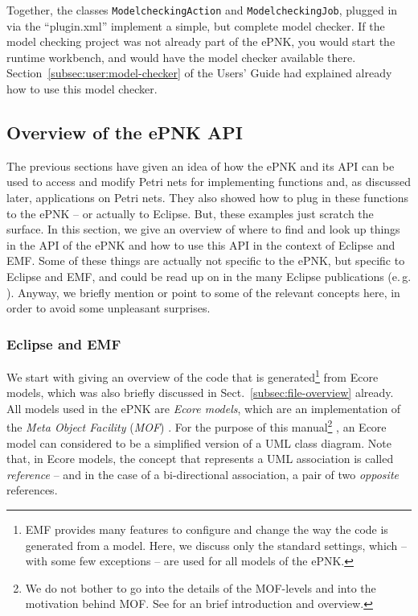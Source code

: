 Together, the classes {\tt ModelcheckingAction} and {\tt ModelcheckingJob},
plugged in via the ``plugin.xml'' implement a simple, but complete model
checker. If the model checking project was not already part of the ePNK, you
would start the runtime workbench, and would have the model checker
available there.  Section~\ref{subsec:user:model-checker} of the
Users' Guide had explained already how to use this model checker.%

\subsection{Overview of the ePNK API}
\label{subsec:devloper:functitions:utilities}

The previous sections have given an idea of how the ePNK and its
API can be used to access and modify Petri nets for implementing
functions and, as discussed later, applications on Petri nets.
They also showed how to plug in these functions
to the ePNK -- or actually to Eclipse. But, these examples just scratch
the surface. In this section, we give an overview of where to find and look
up things in the API of the ePNK and how to use this API in the context
of Eclipse and EMF. Some of these things are actually not specific to
the ePNK, but specific to Eclipse and EMF, and could be read up on
in the many Eclipse publications (e.\,g. \cite{BSM06,ClRu08,Gro09}).
Anyway, we briefly mention or point to some of the relevant concepts
here, in order to avoid some unpleasant surprises.

\subsubsection{Eclipse and EMF}
\label{subsubsec:ePNK:API:EMF}

We start with giving an overview of the code that is generated\footnote
  {EMF provides many features to configure and change the way the code
   is generated from a model. Here, we discuss only the standard settings,
   which -- with some few exceptions -- are used for all models of the ePNK.}
from Ecore models, which was also briefly discussed in
Sect.~\ref{subsec:file-overview} already. All models used in the ePNK are
\emph{Ecore models},%
which are an implementation of the \emph{Meta Object Facility} (\emph{MOF})
\cite{MOF05}. For the purpose of this manual\footnote {We do not bother to go into the details of the MOF-levels and into the
   motivation behind MOF. See \cite{Kin09c} for an brief introduction and
   overview.}%
, an Ecore model can considered to be a simplified version of a UML class
diagram. Note that, in Ecore models, the concept that represents a UML
association is called \emph{reference}%
-- and in the case of a bi-directional association, a pair of two
\emph{opposite} references.


